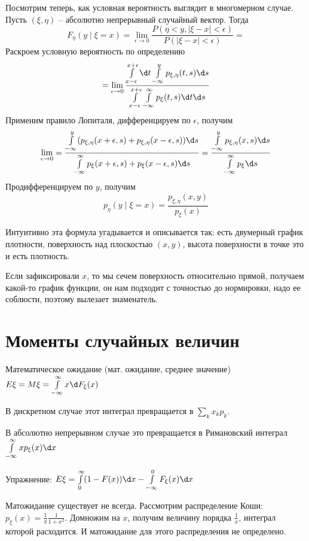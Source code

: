 Посмотрим теперь, как условная вероятность выглядит в многомерном случае.
Пусть $(\xi, \eta)$ -- абсолютно непрерывный случайный вектор. Тогда
$$F_{\eta}(y \mid \xi = x) = \lim\limits_{\epsilon \to 0} \frac{P(\eta < y, |\xi - x| < \epsilon)}{P(|\xi - x| < \epsilon)} =$$
Раскроем условную вероятность по определению
$$ = \lim\limits_{\epsilon \to 0} \frac{\int\limits_{x - \epsilon}^{x + \epsilon} \d t \int\limits_{-\infty}^y p_{\xi, \eta}(t, s) \d s}{\int\limits_{x - \epsilon}^{x + \epsilon} \int\limits_{-\infty}^{\infty}p_\xi(t, s) \d t \d s}$$
Применим правило Лопиталя, дифференцируем по $\epsilon$, получим
$$\lim\limits_{\epsilon \to 0} = \frac{\int\limits_{-\infty}^y (p_{\xi, \eta}(x + \epsilon, s) + p_{\xi, \eta}(x - \epsilon, s)) \d s}{\int\limits_{-\infty}^{\infty}p_\xi(x + \epsilon, s) + p_\xi(x - \epsilon, s)\d s} = \frac{\int\limits_{-\infty}^y p_{\xi, \eta}(x, s) \d s}{\int\limits_{-\infty}^{\infty} p_\xi\d s}$$
Продифференцируем по $y$, получим
$$p_{\eta}(y \mid \xi = x) = \frac{p_{\xi, \eta}(x, y)}{p_{\xi}(x)}$$

Интуитивно эта формула угадывается и описывается так: есть двумерный график плотности, поверхность над плоскостью $(x, y)$, высота поверхности в точке это и есть плотность.

Если зафиксировали $x$, то мы сечем поверхность относительно прямой, получаем какой-то график функции, он нам подходит с точностью до нормировки, надо ее соблюсти, поэтому вылезает знаменатель.

\section{Моменты случайных величин}
\begin{Def}
    Математическое ожидание (мат. ожидание, среднее значение) $E\xi = M\xi = \int\limits_{-\infty}^\infty x \d F_\xi(x)$

    В дискретном случае этот интеграл превращается в $\sum\limits_k x_k p_k$.

    В абсолютно непрерывном случае это превращается в Римановский интеграл $\int\limits_{-\infty}^\infty xp_\xi(x) \d x$
\end{Def}

Упражнение: $E\xi = \int\limits_0^\infty (1 - F(x)) \d x - \int\limits_{-\infty}^0 F_\xi(x) \d x$

\begin{exmp}
Матожидание существует не всегда.
Рассмотрим распределение Коши: $p_\xi(x) = \frac{1}{\pi}\frac{1}{1 + x^2}$. Домножим на $x$, получим величину порядка $\frac{1}{x}$, интеграл которой расходится. 
И матожидание для этого распределения не определено.
\end{exmp}

